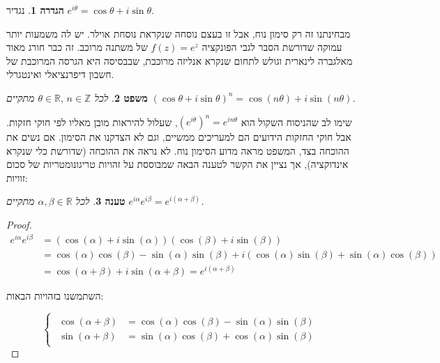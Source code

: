 \documentclass[12pt]{report}
\theoremstyle{plain}
\newtheorem{theorem}{משפט}[chapter]
\newtheorem{proposition}[theorem]{טענה}
\theoremstyle{definition}
\newtheorem{definition}[theorem]{הגדרה}
\newcommand{\R}{\mathbb{R}}
\newcommand{\Z}{\mathbb{Z}}
\newcommand{\0}{\mathbf{0}}
\begin{document}
\begin{definition}
נגדיר
$e^{i\theta}=\cos\theta+i\sin\theta$.
\end{definition}

מבחינתנו זה רק סימון נוח, אבל זו בעצם נוסחה שנקראת נוסחת אוילר. יש
לה משמעות יותר עמוקה שדורשת הסבר לגבי הפונקציה
$f(z)=e^{z}$
של משתנה מרוכב. זה כבר חורג מאוד מאלגברה לינארית וגולש לתחום שנקרא אנליזה
מרוכבת, שבבסיסה היא הגרסה המרוכבת של חשבון דיפרנציאלי ואינטגרלי.

\begin{theorem}\label{thm:De-Moivre}
לכל
$\theta\in\R,\,n\in\Z$
מתקיים
$(\cos\theta+i\sin\theta)^{n}=\cos(n\theta)+i\sin(n\theta)$.
\end{theorem}

שימו לב שהניסוח השקול הוא
$(e^{i\theta})^{n}=e^{in\theta}$,
שעלול להיראות מובן מאליו לפי חוקי חזקות. אבל חוקי החזקות הידועים הם למעריכים
ממשיים, וגם לא הצדקנו את הסימון. אם נשים את ההוכחה בצד, המשפט מראה
מדוע הסימון נוח. לא נראה את ההוכחה (שדורשת כלי שנקרא אינדוקציה), אך
נציין את הקשר לטענה הבאה שמבוססת על זהויות טריגונומטריות של סכום זוויות:

\begin{proposition}\label{prop:angle-addition}
לכל
$\alpha,\beta\in\R$
מתקיים
$e^{i\alpha}e^{i\beta}=e^{i(\alpha+\beta)}$.
\end{proposition}

\begin{proof}
$$
\begin{aligned}
e^{i\alpha}e^{i\beta}&=(\cos(\alpha)+i\sin(\alpha))(\cos(\beta)+i\sin(\beta)) \\
&=\cos(\alpha)\cos(\beta)-\sin(\alpha)\sin(\beta)+i(\cos(\alpha)\sin(\beta)+\sin(\alpha)\cos(\beta)) \\
&=\cos(\alpha+\beta)+i\sin(\alpha+\beta)=e^{i(\alpha+\beta)}
\end{aligned}
$$

השתמשנו בזהויות הבאות:

$$
\begin{cases}
\begin{aligned}
\cos(\alpha+\beta)&=\cos(\alpha)\cos(\beta)-\sin(\alpha)\sin(\beta) \\
\sin(\alpha+\beta)&=\sin(\alpha)\cos(\beta)+\cos(\alpha)\sin(\beta)
\end{aligned}
\end{cases}
$$
\end{proof}
\end{document}
